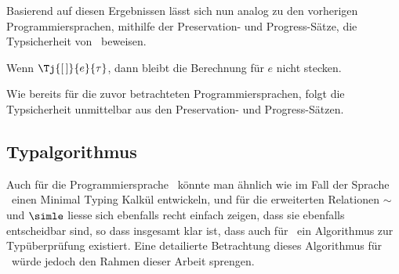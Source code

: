 
Basierend auf diesen Ergebnissen l\"asst sich nun analog zu den vorherigen Programmiersprachen, mithilfe der
Preservation- und Progress-S\"atze, die Typsicherheit von \Lct\ beweisen.

\begin{satz} \label{satz:Lct:Safety} 
  Wenn $\Tj{[\,]}{e}{\tau}$, dann bleibt die Berechnung f\"ur $e$ nicht stecken.
\end{satz}

\begin{beweis}
  Wie bereits f\"ur die zuvor betrachteten Programmiersprachen, folgt die Typsicherheit unmittelbar aus
  den Preservation- und Progress-S\"atzen.
\end{beweis}



\subsection{Typalgorithmus}

Auch f\"ur die Programmiersprache \Lct\ k\"onnte man \"ahnlich wie im Fall der Sprache \Losub\ einen Minimal Typing
Kalk\"ul entwickeln, und f\"ur die erweiterten Relationen $\sim$ und $\simle$ liesse sich ebenfalls recht einfach
zeigen, dass sie ebenfalls entscheidbar sind, so dass insgesamt klar ist, dass auch f\"ur \Lct\ ein Algorithmus
zur Typ\"uberpr\"ufung existiert. Eine detailierte Betrachtung dieses Algorithmus f\"ur \Lct\ w\"urde jedoch den
Rahmen dieser Arbeit sprengen.


